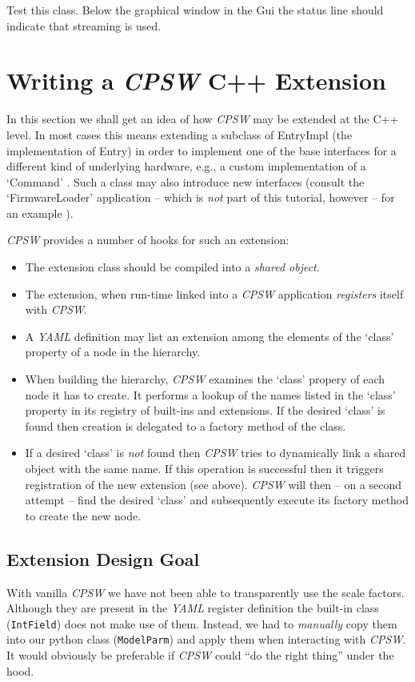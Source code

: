 \documentclass[10pt]{article}
\newcommand{\ita}[1]{\emph{#1}}
\newcommand{\cpsw}      {\ita {CPSW}}
\newcommand{\yaml}      {\ita {YAML}}
\newcommand{\entry}     {{Entry}}
\newcommand{\entryimpl} {{EntryImpl}}
\newcommand{\py}        {python}
\newcommand{\cpp}       {C++}
\newcommand{\cod}[1] {{\tt#1}}
\begin{document}
Test this class. Below the graphical window in the Gui the status line should indicate
that streaming is used.

\section{Writing a \cpsw{} \cpp{} Extension}
In this section we shall get an idea of how \cpsw{} may be extended at the \cpp{} level.
In most cases this means extending a subclass of \entryimpl{} (the implementation of \entry{})
in order to implement one of the base interfaces for a different kind of underlying
hardware, e.g., a custom implementation of a `Command' \cite{myCommand}.
Such a class may also introduce new interfaces (consult the `FirmwareLoader' application
-- which is {\em not} part of this tutorial, however -- for an example \cite{FWLoader}).

\cpsw{} provides a number of hooks for such an extension:
\begin{itemize}
\item The extension class should be compiled into a {\em shared object}.
\item The extension, when run-time linked into a \cpsw{} application {\em registers}
      itself with \cpsw{}.
\item A \yaml{} definition may list an extension among the elements of the `class'
      property of a node in the hierarchy.
\item When building the hierarchy, \cpsw{} examines the `class' propery of each node
      it has to create. It performs a lookup of the names listed in the `class' property
      in its registry of built-ins and extensions. If the desired `class' is found
      then creation is delegated to a factory method of the class.
\item If a desired `class' is {\em not} found then \cpsw{} tries to dynamically
      link a shared object with the same name. If this operation is successful then
      it triggers registration of the new extension (see above). \cpsw{} will then -- on 
      a second attempt -- find the desired `class' and subsequently execute its
      factory method to create the new node.
\end{itemize}

\subsection{Extension Design Goal}
With vanilla \cpsw{} we have not been able to transparently use the scale factors.
Although they are present in the \yaml{} register definition the built-in class
(\cod{IntField}) does not make use of them. Instead, we had to {\em manually}
copy them into our \py{} class (\cod{\mbox{ModelParm}}) and apply them when
interacting with \cpsw{}. It would obviously be preferable if \cpsw{} could ``do
the right thing'' under the hood.
\end{document}
